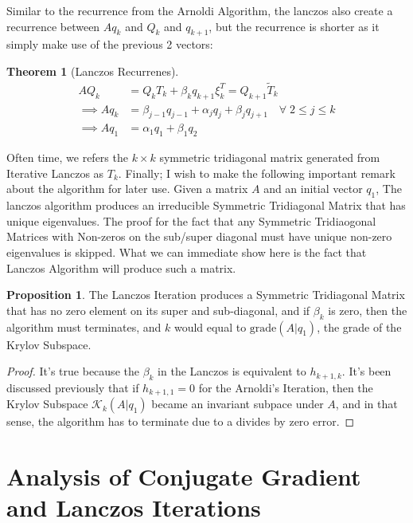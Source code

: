 \documentclass[]{article}
\theoremstyle{definition}
\newtheorem{theorem}{Theorem}  %
\newtheorem{prop}{Proposition}[section]  %
\begin{document}
            Similar to the recurrence from the Arnoldi Algorithm, the lanczos also create a recurrence between $Aq_k$ and $Q_k$ and $q_{k + 1}$, but the recurrence is shorter as it simply make use of the previous 2 vectors: 
            \begin{theorem}[Lanczos Recurrenes]
                \begin{align}
                    AQ_k &= Q_kT_k + \beta_k q_{k + 1}\xi_k^T = Q_{k + 1}\tilde{T}_k
                    \\
                    \implies Aq_k
                    &= \beta_{j - 1}q_{j - 1} + \alpha_j q_j + \beta_{j}q_{j + 1} \quad \forall\; 2\le j\le k
                    \\
                    \implies Aq_1 &= \alpha_1q_1 + \beta_1 q_2
                \end{align}    
            \end{theorem}
            
            \par
            Often time, we refers the $k\times k$ symmetric tridiagonal matrix generated from Iterative Lanczos as $T_k$. Finally; I wish to make the following important remark about the algorithm for later use. Given a matrix $A$ and an initial vector $q_1$, The lanczos algorithm produces an irreducible Symmetric Tridiagonal Matrix that has unique eigenvalues. The proof for the fact that any Symmetric Tridiaogonal Matrices with Non-zeros on the sub/super diagonal must have unique non-zero eigenvalues is skipped. What we can immediate show here is the fact that Lanczos Algorithm will produce such a matrix. 
            \begin{prop}
                The Lanczos Iteration produces a Symmetric Tridiagonal Matrix that has no zero element on its super and sub-diagonal, and if $\beta_k$ is zero, then the algorithm must terminates, and $k$ would equal to $\text{grade}(A|q_1)$, the grade of the Krylov Subspace. 
            \end{prop}
            \begin{proof}
                It's true because the $\beta_{k}$ in the Lanczos is equivalent to $h_{k + 1, k}$. It's been discussed previously that if $h_{k + 1, 1} = 0$ for the Arnoldi's Iteration, then the Krylov Subspace $\mathcal K_k(A|q_1)$ became an invariant subpace under $A$, and in that sense, the algorithm has to terminate due to a divides by zero error. 
            \end{proof}
\section{Analysis of Conjugate Gradient and Lanczos Iterations}
\end{document}
